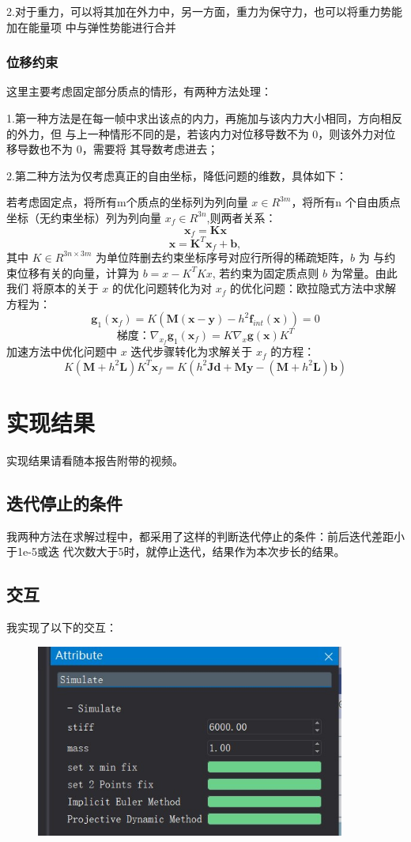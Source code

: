 \documentclass{article}
\begin{document}
	2.对于重力，可以将其加在外力中，另一方面，重力为保守力，也可以将重力势能加在能量项
	中与弹性势能进行合并
	\subsubsection{位移约束}
	这里主要考虑固定部分质点的情形，有两种方法处理：
	
	1.第一种方法是在每一帧中求出该点的内力，再施加与该内力大小相同，方向相反的外力，但
	与上一种情形不同的是，若该内力对位移导数不为 0，则该外力对位移导数也不为 0，需要将
	其导数考虑进去；
	
	2.第二种方法为仅考虑真正的自由坐标，降低问题的维数，具体如下：
	
	若考虑固定点，将所有m个质点的坐标列为列向量 $x\in R^{3m}$，将所有n 
	个自由质点坐标（无约束坐标）列为列向量 $x_f\in R^{3n}$,则两者关系：
	$$\boldsymbol x_f=\boldsymbol K\boldsymbol x$$
	$$\boldsymbol x=\boldsymbol K^T\boldsymbol x_f+\boldsymbol b,$$
	其中 $K\in R^{3n\times 3m}$ 为单位阵删去约束坐标序号对应行所得的稀疏矩阵，$b$ 为
	与约束位移有关的向量，计算为 $b=x-K^TKx$, 若约束为固定质点则 $b$ 为常量。由此我们
	将原本的关于 $x$ 的优化问题转化为对 $x_f$ 的优化问题：欧拉隐式方法中求解方程为：
	$$\boldsymbol g_1(\boldsymbol x_f) = K(\boldsymbol M(\boldsymbol 
	x-\boldsymbol y) -h^2\boldsymbol f_{int}(\boldsymbol x)) = 0$$
	$$\mbox{梯度：}\nabla_{x_f} \boldsymbol g_1(\boldsymbol x_f) = 
	K\nabla_{x} \boldsymbol g(\boldsymbol x)K^T$$
	加速方法中优化问题中 $x$ 迭代步骤转化为求解关于 $x_f$ 的方程：
	$$K(\boldsymbol M+h^2\boldsymbol L)K^T\boldsymbol x_f=K(h^2\boldsymbol J 
	\boldsymbol d+ \boldsymbol M \boldsymbol y-(\boldsymbol M+h^2\boldsymbol 
	L)\boldsymbol b)$$
	\section{实现结果}
	实现结果请看随本报告附带的视频。
	\subsection{迭代停止的条件}
	我两种方法在求解过程中，都采用了这样的判断迭代停止的条件：前后迭代差距小于1e-5或迭
	代次数大于5时，就停止迭代，结果作为本次步长的结果。
	\clearpage
	\subsection{交互}
	我实现了以下的交互：
	\begin{figure}[htb]
		\begin{center}
			\includegraphics[width=4in]{ui.jpg}
		\end{center}
	\end{figure}
\end{document}
